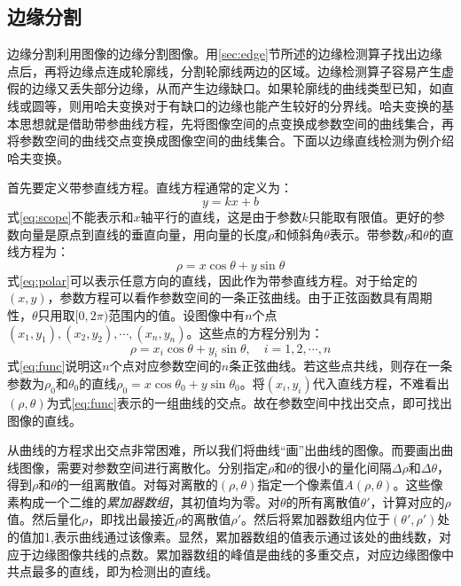 \subsection{边缘分割}

边缘分割利用图像的边缘分割图像。用\ref{sec:edge}节所述的边缘检测算子找出边缘点后，再将边缘点连成轮廓线，分割轮廓线两边的区域。边缘检测算子容易产生虚假的边缘又丢失部分边缘，从而产生边缘缺口。如果轮廓线的曲线类型已知，如直线或圆等，则用哈夫变换对于有缺口的边缘也能产生较好的分界线。哈夫变换的基本思想就是借助带参曲线方程，先将图像空间的点变换成参数空间的曲线集合，再将参数空间的曲线交点变换成图像空间的曲线集合。下面以边缘直线检测为例介绍哈夫变换。

首先要定义带参直线方程。直线方程通常的定义为：
\begin{equation}
\label{eq:scope}
  y=kx+b
\end{equation}
式\eqref{eq:scope}不能表示和$x$轴平行的直线，这是由于参数$k$只能取有限值。更好的参数向量是原点到直线的垂直向量，用向量的长度$\rho$和倾斜角$\theta$表示。带参数$\rho$和$\theta$的直线方程为：
\begin{equation}
  \label{eq:polar}
  \rho=x\cos\theta+y\sin\theta
\end{equation}
式\eqref{eq:polar}可以表示任意方向的直线，因此作为带参直线方程。对于给定的$(x,y)$，参数方程可以看作参数空间的一条正弦曲线。由于正弦函数具有周期性，$\theta$只用取$[0,2\pi)$范围内的值。设图像中有$n$个点$(x_1,y_1),(x_2,y_2),\cdots,(x_n,y_n)$。这些点的方程分别为：
\begin{equation}
\label{eq:func}
  \rho=x_i\cos\theta+y_i\sin\theta,\quad i=1,2,\cdots,n
\end{equation}
式\eqref{eq:func}说明这$n$个点对应参数空间的$n$条正弦曲线。若这些点共线，则存在一条参数为$\rho_0$和$\theta_0$的直线$\rho_0=x\cos\theta_0+y\sin\theta_0$。将$(x_i,y_i)$代入直线方程，不难看出$(\rho,\theta)$为式\eqref{eq:func}表示的一组曲线的交点。故在参数空间中找出交点，即可找出图像的直线。

从曲线的方程求出交点非常困难，所以我们将曲线“画”出曲线的图像。而要画出曲线图像，需要对参数空间进行离散化。分别指定$\rho$和$\theta$的很小的量化间隔$\Delta\rho$和$\Delta\theta$，得到$\rho$和$\theta$的一组离散值。对每对离散的$(\rho,\theta)$指定一个像素值$A(\rho,\theta)$。这些像素构成一个二维的\emph{累加器数组}，其初值均为零。对$\theta$的所有离散值$\theta'$，计算对应的$\rho$值。然后量化$\rho$，即找出最接近$\rho$的离散值$\rho'$。然后将累加器数组内位于$(\theta',\rho')$处的值加1,表示曲线通过该像素。显然，累加器数组的值表示通过该处的曲线数，对应于边缘图像共线的点数。累加器数组的峰值是曲线的多重交点，对应边缘图像中共点最多的直线，即为检测出的直线。

